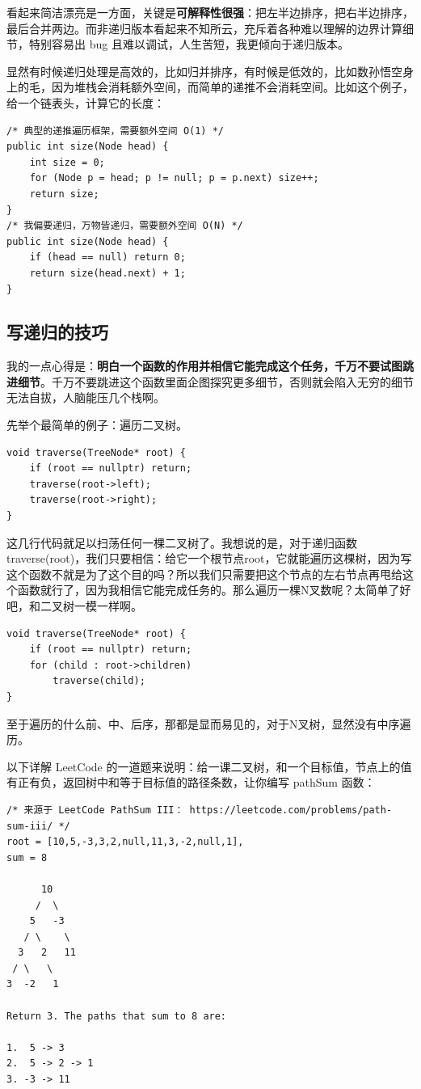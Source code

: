\documentclass[12pt]{article}
\begin{document}
看起来简洁漂亮是一方面，关键是\textbf{可解释性很强}：把左半边排序，把右半边排序，最后合并两边。而非递归版本看起来不知所云，充斥着各种难以理解的边界计算细节，特别容易出 bug 且难以调试，人生苦短，我更倾向于递归版本。

显然有时候递归处理是高效的，比如归并排序，有时候是低效的，比如数孙悟空身上的毛，因为堆栈会消耗额外空间，而简单的递推不会消耗空间。比如这个例子，给一个链表头，计算它的长度：
\begin{lstlisting}
/* 典型的递推遍历框架，需要额外空间 O(1) */
public int size(Node head) {
    int size = 0;
    for (Node p = head; p != null; p = p.next) size++;
    return size;
}
/* 我偏要递归，万物皆递归，需要额外空间 O(N) */
public int size(Node head) {
    if (head == null) return 0;
    return size(head.next) + 1;
}
\end{lstlisting}

\subsection{写递归的技巧}
我的一点心得是：\textbf{明白一个函数的作用并相信它能完成这个任务，千万不要试图跳进细节}。千万不要跳进这个函数里面企图探究更多细节，否则就会陷入无穷的细节无法自拔，人脑能压几个栈啊。

先举个最简单的例子：遍历二叉树。
\begin{lstlisting}
void traverse(TreeNode* root) {
    if (root == nullptr) return;
    traverse(root->left);
    traverse(root->right);
}
\end{lstlisting}

这几行代码就足以扫荡任何一棵二叉树了。我想说的是，对于递归函数traverse(root)，我们只要相信：给它一个根节点root，它就能遍历这棵树，因为写这个函数不就是为了这个目的吗？所以我们只需要把这个节点的左右节点再甩给这个函数就行了，因为我相信它能完成任务的。那么遍历一棵N叉数呢？太简单了好吧，和二叉树一模一样啊。
\begin{lstlisting}
void traverse(TreeNode* root) {
    if (root == nullptr) return;
    for (child : root->children)
        traverse(child);
}
\end{lstlisting}

至于遍历的什么前、中、后序，那都是显而易见的，对于N叉树，显然没有中序遍历。

以下详解 LeetCode 的一道题来说明：给一课二叉树，和一个目标值，节点上的值有正有负，返回树中和等于目标值的路径条数，让你编写 pathSum 函数：
\begin{lstlisting}
/* 来源于 LeetCode PathSum III： https://leetcode.com/problems/path-sum-iii/ */
root = [10,5,-3,3,2,null,11,3,-2,null,1],
sum = 8

      10
     /  \
    5   -3
   / \    \
  3   2   11
 / \   \
3  -2   1

Return 3. The paths that sum to 8 are:

1.  5 -> 3
2.  5 -> 2 -> 1
3. -3 -> 11
\end{lstlisting}
\end{document}
